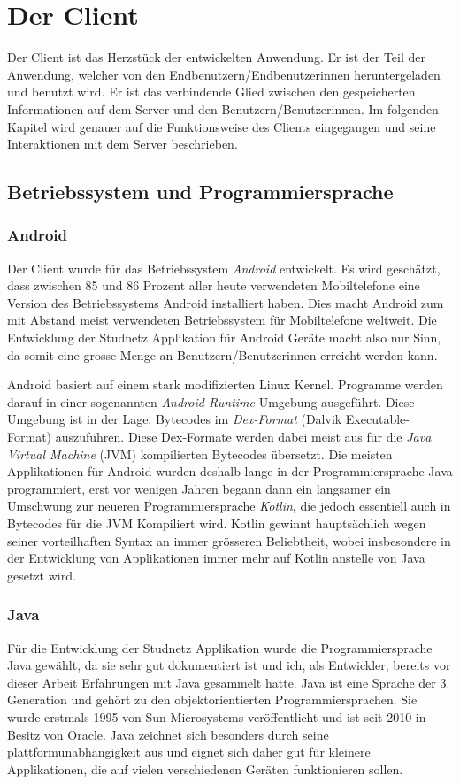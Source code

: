 \documentclass[../main.tex]{subfiles}
\begin{document}
	\chapter{Der Client}
	Der Client ist das Herzstück der entwickelten Anwendung. Er ist der Teil der Anwendung, welcher von den Endbenutzern/Endbenutzerinnen heruntergeladen und benutzt wird. Er ist das verbindende Glied zwischen den gespeicherten Informationen auf dem Server und den Benutzern/Benutzerinnen. Im folgenden Kapitel wird genauer auf die Funktionsweise des Clients eingegangen und seine Interaktionen mit dem Server beschrieben.
	
	\section{Betriebssystem und Programmiersprache}
	
	\subsection{Android}
	Der Client wurde für das Betriebssystem \emph{Android} entwickelt. Es wird geschätzt, dass zwischen 85 und 86 Prozent aller heute verwendeten Mobiltelefone eine Version des Betriebssystems Android installiert haben. Dies macht Android zum mit Abstand meist verwendeten Betriebssystem für Mobiltelefone weltweit. Die Entwicklung der Studnetz Applikation für Android Geräte macht also nur Sinn, da somit eine grosse Menge an Benutzern/Benutzerinnen erreicht werden kann. \cite{android}
	
	Android basiert auf einem stark modifizierten Linux Kernel. Programme werden darauf in einer sogenannten \emph{Android Runtime} Umgebung ausgeführt. Diese Umgebung ist in der Lage, Bytecodes \cite{bytecode} im \emph{Dex-Format} (Dalvik Executable-Format) auszuführen. Diese Dex-Formate werden dabei meist aus für die \emph{Java Virtual Machine} (JVM) kompilierten Bytecodes übersetzt. Die meisten Applikationen für Android wurden deshalb lange in der Programmiersprache Java programmiert, erst vor wenigen Jahren begann dann ein langsamer ein Umschwung zur neueren Programmiersprache \emph{Kotlin}, die jedoch essentiell auch in Bytecodes für die JVM Kompiliert wird. Kotlin gewinnt hauptsächlich wegen seiner vorteilhaften Syntax an immer grösseren Beliebtheit, wobei insbesondere in der Entwicklung von Applikationen immer mehr auf Kotlin anstelle von Java gesetzt wird. \cite{androidJava}
	
	\subsection{Java}
	Für die Entwicklung der Studnetz Applikation wurde die Programmiersprache Java gewählt, da sie sehr gut dokumentiert ist und ich, als Entwickler, bereits vor dieser Arbeit Erfahrungen mit Java gesammelt hatte. Java ist eine Sprache der 3. Generation und gehört zu den objektorientierten Programmiersprachen. Sie wurde erstmals 1995 von Sun Microsystems veröffentlicht und ist seit 2010 in Besitz von Oracle. Java zeichnet sich besonders durch seine plattformunabhängigkeit aus und eignet sich daher gut für kleinere Applikationen, die auf vielen verschiedenen Geräten funktionieren sollen.
	
\end{document}
